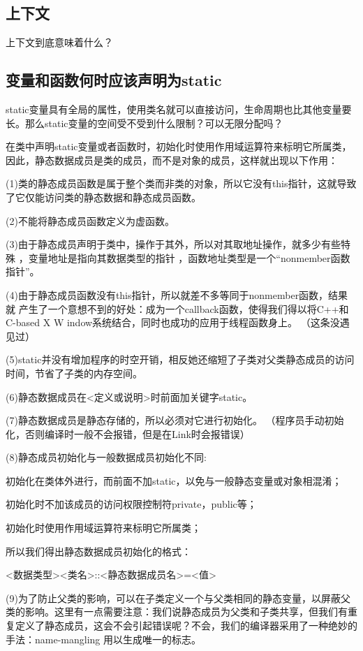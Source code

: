 \subsection{上下文}
上下文到底意味着什么？
\subsection{变量和函数何时应该声明为static}
static变量具有全局的属性，使用类名就可以直接访问，生命周期也比其他变量要长。那么static变量的空间受不受到什么限制？可以无限分配吗？

在类中声明static变量或者函数时，初始化时使用作用域运算符来标明它所属类，因此，静态数据成员是类的成员，而不是对象的成员，这样就出现以下作用：

(1)类的静态成员函数是属于整个类而非类的对象，所以它没有this指针，这就导致 了它仅能访问类的静态数据和静态成员函数。      

(2)不能将静态成员函数定义为虚函数。      

(3)由于静态成员声明于类中，操作于其外，所以对其取地址操作，就多少有些特殊 ，变量地址是指向其数据类型的指针 ，函数地址类型是一个“nonmember函数指针”。

(4)由于静态成员函数没有this指针，所以就差不多等同于nonmember函数，结果就 产生了一个意想不到的好处：成为一个callback函数，使得我们得以将C++和C-based X W indow系统结合，同时也成功的应用于线程函数身上。 （这条没遇见过）  

(5)static并没有增加程序的时空开销，相反她还缩短了子类对父类静态成员的访问 时间，节省了子类的内存空间。      

(6)静态数据成员在<定义或说明>时前面加关键字static。      

(7)静态数据成员是静态存储的，所以必须对它进行初始化。 （程序员手动初始化，否则编译时一般不会报错，但是在Link时会报错误） 

(8)静态成员初始化与一般数据成员初始化不同:

初始化在类体外进行，而前面不加static，以免与一般静态变量或对象相混淆；

初始化时不加该成员的访问权限控制符private，public等；     
   
初始化时使用作用域运算符来标明它所属类；

所以我们得出静态数据成员初始化的格式：

<数据类型><类名>::<静态数据成员名>=<值>

(9)为了防止父类的影响，可以在子类定义一个与父类相同的静态变量，以屏蔽父类的影响。这里有一点需要注意：我们说静态成员为父类和子类共享，但我们有重复定义了静态成员，这会不会引起错误呢？不会，我们的编译器采用了一种绝妙的手法：name-mangling 用以生成唯一的标志。
